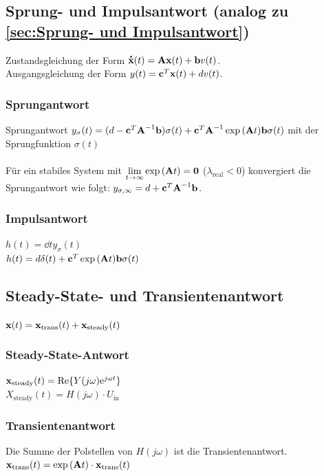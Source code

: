 \documentclass[fs, footer]{latex4ei}
\begin{document}
\begin{multicols*}{4}
		\subsection{Sprung- und Impulsantwort (analog zu \ref{sec:Sprung- und Impulsantwort})}
		Zustandsgleichung der Form $\accentset{\mbox{\textrm{\large\bfseries .}} }{\textbf{x}}(t) = \textbf{A}\textbf{x}(t)+\textbf{b}v(t)$.\\
		Ausgangsgleichung der Form $y(t) = \textbf{c}^T\textbf{x}(t) + dv(t)$.
		\subsubsection{Sprungantwort}
		
		Sprungantwort $y_\sigma(t) = (d-\textbf{c}^T\textbf{A}^{-1}\textbf{b})\sigma (t) + \textbf{c}^T\textbf{A}^{-1}\exp{(\textbf{A}t)}\textbf{b}\sigma(t)$ mit der Sprungfunktion $\sigma(t)$\\ \\
		Für ein stabiles System mit $\lim_{t\rightarrow\infty}\exp{(\ma At)} = \ma 0$ ($\lambda_{\text{real}} < 0$) konvergiert die Sprungantwort wie folgt: $y_{\sigma,\infty} = d + \textbf{c}^T\textbf{A}^{-1}\textbf{b}$.
		\subsubsection{Impulsantwort}
		$h(t) = \dd t y_\sigma(t)$\\
		$h(t) = d\delta (t) + \textbf{c}^T\exp{(\textbf{A}t)}\textbf{b}\sigma(t)$
		\subsection{Steady-State- und Transientenantwort}
		$\textbf{x}(t) = \textbf{x}_{\text{trans}}(t) + \textbf{x}_{\text{steady}}(t)$
		\subsubsection{Steady-State-Antwort}
		$\textbf{x}_{\text{steady}}(t) = \text{Re}\{Y(j\omega)\mathrm{e}^{j\omega t}\}$\\
		$X_{\text{steady}}(t) = H(j\omega) \cdot U_{\text{in}}$
		\subsubsection{Transientenantwort}
		Die Summe der Polstellen von $H(j\omega)$ ist die Transientenantwort.\\
		$\textbf{x}_{\text{trans}}(t) = \exp{(\textbf{A}t)} \cdot \textbf{x}_{\text{trans}}(t)$

\end{multicols*}
\end{document}
